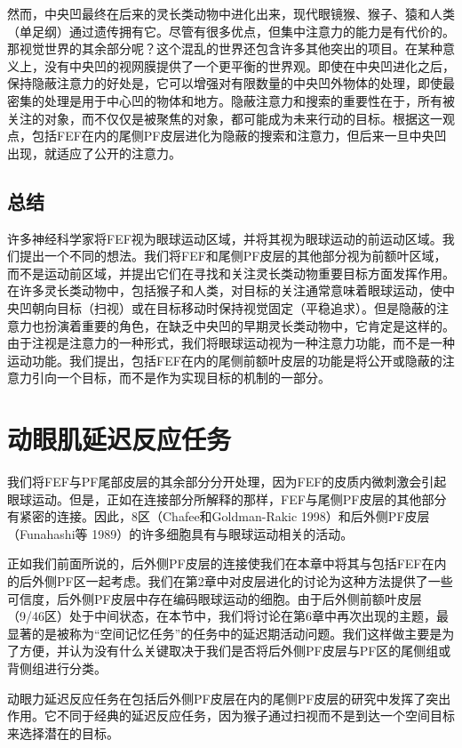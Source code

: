然而，中央凹最终在后来的灵长类动物中进化出来，现代眼镜猴、猴子、猿和人类（单足纲）通过遗传拥有它。尽管有很多优点，但集中注意力的能力是有代价的。那视觉世界的其余部分呢？这个混乱的世界还包含许多其他突出的项目。在某种意义上，没有中央凹的视网膜提供了一个更平衡的世界观。即使在中央凹进化之后，保持隐蔽注意力的好处是，它可以增强对有限数量的中央凹外物体的处理，即使最密集的处理是用于中心凹的物体和地方。隐蔽注意力和搜索的重要性在于，所有被关注的对象，而不仅仅是被聚焦的对象，都可能成为未来行动的目标。根据这一观点，包括FEF在内的尾侧PF皮层进化为隐蔽的搜索和注意力，但后来一旦中央凹出现，就适应了公开的注意力。
\subsection{总结}
许多神经科学家将FEF视为眼球运动区域，并将其视为眼球运动的前运动区域。我们提出一个不同的想法。我们将FEF和尾侧PF皮层的其他部分视为前额叶区域，而不是运动前区域，并提出它们在寻找和关注灵长类动物重要目标方面发挥作用。在许多灵长类动物中，包括猴子和人类，对目标的关注通常意味着眼球运动，使中央凹朝向目标（扫视）或在目标移动时保持视觉固定（平稳追求）。但是隐蔽的注意力也扮演着重要的角色，在缺乏中央凹的早期灵长类动物中，它肯定是这样的。由于注视是注意力的一种形式，我们将眼球运动视为一种注意力功能，而不是一种运动功能。我们提出，包括FEF在内的尾侧前额叶皮层的功能是将公开或隐蔽的注意力引向一个目标，而不是作为实现目标的机制的一部分。

\section{动眼肌延迟反应任务}
我们将FEF与PF尾部皮层的其余部分分开处理，因为FEF的皮质内微刺激会引起眼球运动。但是，正如在连接部分所解释的那样，FEF与尾侧PF皮层的其他部分有紧密的连接。因此，8区（Chafee和Goldman-Rakic 1998）和后外侧PF皮层（Funahashi等 1989）的许多细胞具有与眼球运动相关的活动。

正如我们前面所说的，后外侧PF皮层的连接使我们在本章中将其与包括FEF在内的后外侧PF区一起考虑。我们在第2章中对皮层进化的讨论为这种方法提供了一些可信度，后外侧PF皮层中存在编码眼球运动的细胞。由于后外侧前额叶皮层（9/46区）处于中间状态，在本节中，我们将讨论在第6章中再次出现的主题，最显著的是被称为“空间记忆任务”的任务中的延迟期活动问题。我们这样做主要是为了方便，并认为没有什么关键取决于我们是否将后外侧PF皮层与PF区的尾侧组或背侧组进行分类。

动眼力延迟反应任务在包括后外侧PF皮层在内的尾侧PF皮层的研究中发挥了突出作用。它不同于经典的延迟反应任务，因为猴子通过扫视而不是到达一个空间目标来选择潜在的目标。

